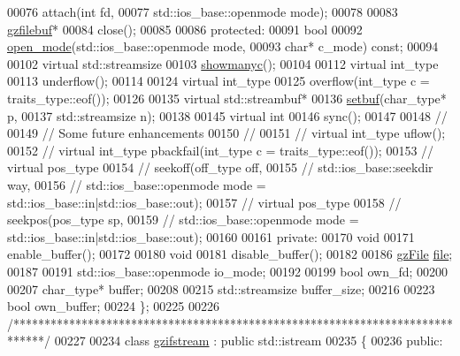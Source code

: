 \begin{DoxyCode}
00076   attach(\textcolor{keywordtype}{int} fd,
00077          std::ios\_base::openmode mode);
00078 
00083   \hyperlink{classgzfilebuf}{gzfilebuf}*
00084   close();
00085 
00086 \textcolor{keyword}{protected}:
00091   \textcolor{keywordtype}{bool}
00092   \hyperlink{classgzfilebuf_ab0c2c304183e591706681af26add3da2}{open\_mode}(std::ios\_base::openmode mode,
00093             \textcolor{keywordtype}{char}* c\_mode) \textcolor{keyword}{const};
00094 
00102   \textcolor{keyword}{virtual} std::streamsize
00103   \hyperlink{classgzfilebuf_afbe2418d8a9c3f4a321cc26aa4ae5f7a}{showmanyc}();
00104 
00112   \textcolor{keyword}{virtual} int\_type
00113   underflow();
00114 
00124   \textcolor{keyword}{virtual} int\_type
00125   overflow(int\_type c = traits\_type::eof());
00126 
00135   \textcolor{keyword}{virtual} std::streambuf*
00136   \hyperlink{classgzfilebuf_a856bc21f7cfc6ba43f017c9c3f0d5f81}{setbuf}(char\_type* p,
00137          std::streamsize n);
00138 
00145   \textcolor{keyword}{virtual} \textcolor{keywordtype}{int}
00146   sync();
00147 
00148 \textcolor{comment}{//}
00149 \textcolor{comment}{// Some future enhancements}
00150 \textcolor{comment}{//}
00151 \textcolor{comment}{//  virtual int\_type uflow();}
00152 \textcolor{comment}{//  virtual int\_type pbackfail(int\_type c = traits\_type::eof());}
00153 \textcolor{comment}{//  virtual pos\_type}
00154 \textcolor{comment}{//  seekoff(off\_type off,}
00155 \textcolor{comment}{//          std::ios\_base::seekdir way,}
00156 \textcolor{comment}{//          std::ios\_base::openmode mode = std::ios\_base::in|std::ios\_base::out);}
00157 \textcolor{comment}{//  virtual pos\_type}
00158 \textcolor{comment}{//  seekpos(pos\_type sp,}
00159 \textcolor{comment}{//          std::ios\_base::openmode mode = std::ios\_base::in|std::ios\_base::out);}
00160 
00161 \textcolor{keyword}{private}:
00170   \textcolor{keywordtype}{void}
00171   enable\_buffer();
00172 
00180   \textcolor{keywordtype}{void}
00181   disable\_buffer();
00182 
00186   \hyperlink{structgz_file__s}{gzFile} \hyperlink{structfile}{file};
00187 
00191   std::ios\_base::openmode io\_mode;
00192 
00199   \textcolor{keywordtype}{bool} own\_fd;
00200 
00207   char\_type* buffer;
00208 
00215   std::streamsize buffer\_size;
00216 
00223   \textcolor{keywordtype}{bool} own\_buffer;
00224 \};
00225 
00226 \textcolor{comment}{/*****************************************************************************/}
00227 
00234 \textcolor{keyword}{class }\hyperlink{classgzifstream}{gzifstream} : \textcolor{keyword}{public} std::istream
00235 \{
00236 \textcolor{keyword}{public}:

\end{DoxyCode}
